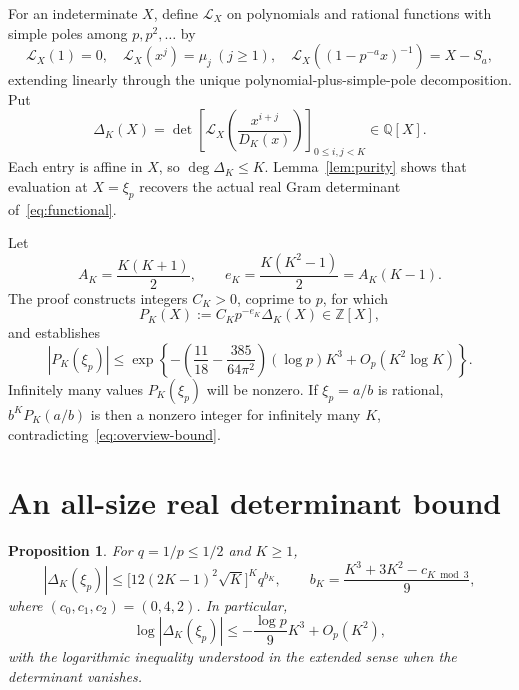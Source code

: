\documentclass[11pt]{article}
\newtheorem{proposition}[theorem]{Proposition}
\theoremstyle{remark}
\newcommand{\Z}{\mathbb Z}
\newcommand{\Q}{\mathbb Q}
\newcommand{\Lcal}{\mathcal L}
\begin{document}
For an indeterminate $X$, define $\Lcal_X$ on polynomials and rational
functions with simple poles among $p,p^2,\ldots$ by
\begin{equation}\label{eq:formal-functional}
 \Lcal_X(1)=0,\quad \Lcal_X(x^j)=\mu_j\ (j\ge1),\quad
 \Lcal_X((1-p^{-a}x)^{-1})=X-S_a,
\end{equation}
extending linearly through the unique polynomial-plus-simple-pole
decomposition. Put
\begin{equation}\label{eq:Delta}
 \Delta_K(X)=\det\left[
 \Lcal_X\left(\frac{x^{i+j}}{D_K(x)}\right)
 \right]_{0\le i,j<K}\in\Q[X].
\end{equation}
Each entry is affine in $X$, so $\deg\Delta_K\le K$. Lemma~\ref{lem:purity}
shows that evaluation at $X=\xi_p$ recovers the actual real Gram
determinant of~\eqref{eq:functional}.

Let
\begin{equation}\label{eq:Edef}
 A_K=\frac{K(K+1)}2,\qquad
 e_K=\frac{K(K^2-1)}2=A_K(K-1).
\end{equation}
The proof constructs integers $C_K>0$, coprime to $p$, for which
\[
 P_K(X):=C_Kp^{-e_K}\Delta_K(X)\in\Z[X],
\]
and establishes
\begin{equation}\label{eq:overview-bound}
 |P_K(\xi_p)|\le
 \exp\left\{-\left(\frac{11}{18}-\frac{385}{64\pi^2}\right)
 (\log p)K^3+O_p(K^2\log K)\right\}.
\end{equation}
Infinitely many values $P_K(\xi_p)$ will be nonzero. If $\xi_p=a/b$ is
rational, $b^KP_K(a/b)$ is then a nonzero integer for infinitely many
$K$, contradicting~\eqref{eq:overview-bound}.

\section{An all-size real determinant bound}

\begin{proposition}\label{prop:analytic}
For $q=1/p\le1/2$ and $K\ge1$,
\begin{equation}\label{eq:analytic-exact}
 |\Delta_K(\xi_p)|\le
 \bigl[12(2K-1)^2\sqrt K\bigr]^Kq^{b_K},
 \qquad
 b_K=\frac{K^3+3K^2-c_{K\bmod3}}9,
\end{equation}
where $(c_0,c_1,c_2)=(0,4,2)$. In particular,
\[
 \log|\Delta_K(\xi_p)|\le-\frac{\log p}{9}K^3+O_p(K^2),
\]
with the logarithmic inequality understood in the extended sense when
the determinant vanishes.
\end{proposition}
\end{document}
